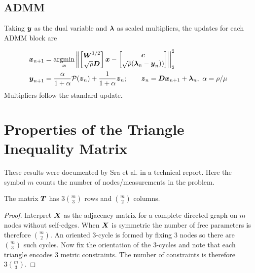 \documentclass{article}
\begin{document}
\subsection*{ADMM}

Taking $\boldsymbol{y}$ as the dual variable and $\boldsymbol{\lambda}$ as scaled multipliers, the updates for each ADMM block are

\begin{align*}
  \boldsymbol{x}_{n+1}
  &= \underset{\boldsymbol{x}}{\mathop{\rm argmin}\nolimits} \left\|
    \begin{bmatrix}
      \boldsymbol{W}^{1/2} \\
      \sqrt{\rho} \boldsymbol{D}
    \end{bmatrix} \boldsymbol{x}
    -
    \begin{bmatrix}
      \boldsymbol{c} \\
      \sqrt{\rho} (\boldsymbol{\lambda}_{n} - \boldsymbol{y}_{n}))
    \end{bmatrix}
  \right\|_{2}^{2} \\
  \boldsymbol{y}_{n+1}
  &= \frac{\alpha}{1+\alpha} \mathcal{P}(\boldsymbol{z}_{n}) + \frac{1}{1+\alpha} \boldsymbol{z}_{n};
  \qquad \boldsymbol{z}_{n} = \boldsymbol{D} \boldsymbol{x}_{n+1} + \boldsymbol{\lambda}_{n},~\alpha = \rho / \mu
\end{align*}
Multipliers follow the standard update.

\section*{\center Properties of the Triangle Inequality Matrix}

These results were documented by Sra et al. in a technical report.
Here the symbol $m$ counts the number of nodes/measurements in the problem.

\begin{proposition}
    The matrix \(\boldsymbol{T}\) has \(3 \binom{m}{3}\) rows and \(\binom{m}{2}\) columns.
\end{proposition}
\begin{proof}
    Interpret \(\boldsymbol{X}\) as the adjacency matrix for a complete directed graph on \(m\) nodes without self-edges.
    When \(\boldsymbol{X}\) is symmetric the number of free parameters is therefore \(\binom{m}{2}\).
    An oriented \(3\)-cycle is formed by fixing \(3\) nodes so there are \(\binom{m}{3}\) such cycles.
    Now fix the orientation of the \(3\)-cycles and note that each triangle encodes \(3\) metric constraints.
    The number of constraints is therefore \(3 \binom{m}{3}\).
\end{proof}
\end{document}
